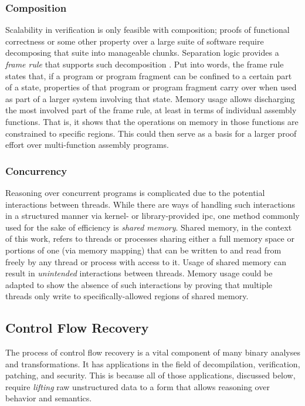 \subsubsection{Composition}\label{sse:composition}
Scalability in verification is only feasible with composition; proofs of functional correctness or some other property over a large suite of software require decomposing that suite into manageable chunks.
Separation logic provides a \emph{frame rule} that supports such%
decomposition \autocite{o2001local,reynolds2002separation,krebbers2017essence}.
Put into words, the frame rule states that,
if a program or program fragment can be confined to a certain part of a state, properties of that program or program fragment carry over when used as part of a larger system involving that state.
Memory usage allows discharging the most involved part of the frame rule, at least in terms of individual assembly functions.
That is, it shows that the operations on memory in those functions are constrained to specific regions.
This could then serve as a basis for a larger proof effort over multi-function assembly programs.

\subsubsection{Concurrency}
Reasoning over concurrent programs is complicated due to the potential interactions between threads.
While there are ways of handling such interactions in a structured manner via kernel- or library-provided \ac{ipc}, one method commonly used for the sake of efficiency is \emph{shared memory}.
Shared memory, in the context of this work, refers to threads or processes sharing either a full memory space or portions of one (via memory mapping) that can be written to and read from freely by any thread or process with access to it.
Usage of shared memory can result in \emph{unintended} interactions between threads.
Memory usage could be adapted to show the absence of such interactions by proving that multiple threads only write to specifically-allowed regions of shared memory.

\subsection{Control Flow Recovery}
The process of control flow recovery is a vital component of many binary analyses and transformations. It has applications in the field of decompilation, verification, patching, and security.
This is because all of those applications, discussed below, require \emph{lifting} raw unstructured data to a form that allows reasoning over behavior and semantics.

